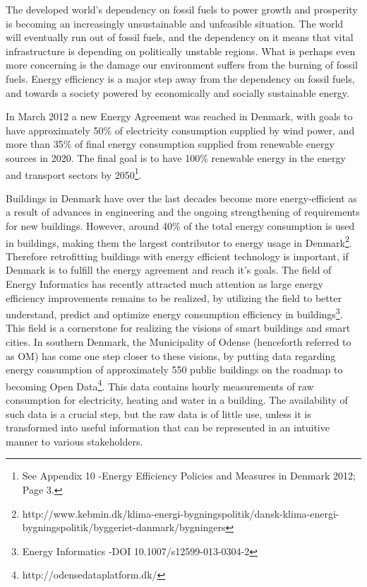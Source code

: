 The developed world’s dependency on fossil fuels to power growth and prosperity is becoming an increasingly unsustainable and unfeasible situation. The world will eventually run out of fossil fuels, and the dependency on it means that vital infrastructure is depending on politically unstable regions. What is perhaps even more concerning is the damage our environment suffers from the burning of fossil fuels. Energy efficiency is a major step away from the dependency on fossil fuels, and towards a society powered by economically and socially sustainable energy. 

In March 2012 a new Energy Agreement was reached in Denmark, with goals to have approximately 50\% of electricity consumption supplied by wind power, and more than 35\% of final energy consumption supplied from renewable energy sources in 2020. The final goal is to have 100\% renewable energy in the energy and transport sectors by 2050\footnote{See Appendix 10 -Energy Efficiency Policies and Measures in Denmark 2012; Page 3.}.

Buildings in Denmark have over the last decades become more energy-efficient as a result of advances in engineering and the ongoing strengthening of requirements for new buildings. However, around 40\% of the total energy consumption  is used in buildings, making them the largest contributor to energy usage in Denmark\footnote{http://www.kebmin.dk/klima-energi-bygningspolitik/dansk-klima-energi-bygningspolitik/byggeriet-danmark/bygningers}. Therefore retrofitting buildings with energy efficient technology is important, if Denmark is to fulfill the energy agreement and reach it’s goals. The field of Energy Informatics has recently attracted much attention as large energy efficiency improvements remains to be realized, by utilizing the field to better understand, predict and optimize energy consumption efficiency in buildings\footnote{Energy Informatics -DOI 10.1007/s12599-013-0304-2}. This field is a cornerstone for realizing the visions of smart buildings and smart cities. In southern Denmark, the Municipality of Odense (henceforth referred to as OM) has come one step closer to these visions, by putting data regarding energy consumption of approximately 550 public buildings on the roadmap to becoming Open Data\footnote{http://odensedataplatform.dk/}. This data contains hourly measurements of raw consumption for electricity, heating and water in a building. The availability of such data is a crucial step, but the raw data is of little use, unless it is transformed into useful information that can be represented in an intuitive manner to various stakeholders.

